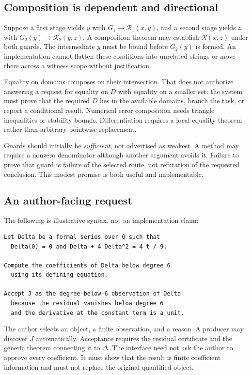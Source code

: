 \documentclass[11pt,letterpaper]{article}
\begin{document}
\subsection{Composition is dependent and directional}
Suppose a first stage yields \(y\) with \(G_1\to\mathcal R_1(x,y)\), and a
second stage yields \(z\) with \(G_2(y)\to\mathcal R_2(y,z)\). A composition
theorem may establish \(\mathcal R(x,z)\) under both guards. The intermediate
\(y\) must be bound before \(G_2(y)\) is formed. An implementation cannot
flatten these conditions into unrelated strings or move them across a witness
scope without justification.

Equality on domains composes on their intersection. That does not authorize
answering a request for equality on \(D\) with equality on a smaller set: the
system must prove that the required \(D\) lies in the available domains, branch
the task, or report a conditional result. Numerical error composition needs
triangle inequalities or stability bounds. Differentiation requires a local
equality theorem rather than arbitrary pointwise replacement.

Guards should initially be \emph{sufficient}, not advertised as weakest. A
method may require a nonzero denominator although another argument avoids it.
Failure to prove that guard is failure of the selected route, not refutation of
the requested conclusion. This modest promise is both useful and implementable.

\subsection{An author-facing request}
The following is illustrative syntax, not an implementation claim:
\begin{lstlisting}
Let Delta be a formal series over Q such that
  Delta(0) = 0 and Delta + 4 Delta^2 = 4 t / 9.

Compute the coefficients of Delta below degree 6
  using its defining equation.

Accept J as the degree-below-6 observation of Delta
  because the residual vanishes below degree 6
  and the derivative at the constant term is a unit.
\end{lstlisting}
The author selects an object, a finite observation, and a reason. A producer may
discover \(J\) automatically. Acceptance requires the residual certificate and
the generic theorem connecting it to \(\Delta\). The interface need not ask the
author to approve every coefficient. It must show that the result is finite
coefficient information and must not replace the original quantified object.
\end{document}
